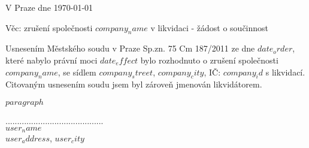 \documentclass{../static/myletter}
\begin{document}
\begin{letter}{}
\opening{V Praze dne \today}
Věc: zrušení společnosti \textbf{$company_name$} v likvidaci - žádost o součinnost                  

Usnesením Městského soudu v Praze Sp.zn. 75 Cm 187/2011 ze dne $date_order$, které nabylo právní moci $date_effect$ bylo rozhodnuto o zrušení společnosti $company_name$, se sídlem $company_street$, $company_city$,  IČ: \textbf{$company_id$} s likvidací. Citovaným usnesením soudu jsem byl zároveň jmenován likvidátorem.  

$paragraph$

\hspace*{5cm}

\closing{..........................................\\ $user_name$ \\ $user_address$, $user_city$}
\end{letter}
\end{document}
